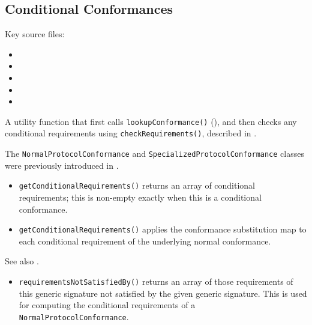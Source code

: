 \documentclass[../generics]{subfiles}
\begin{document}
\subsection*{Conditional Conformances}

Key source files:
\begin{itemize}
\item {}
\item {}
\item {}
\item {}
\item {}
\end{itemize}

A utility function that first calls \texttt{lookupConformance()} (), and then checks any conditional requirements using \texttt{checkRequirements()}, described in .

The \verb|NormalProtocolConformance| and \verb|SpecializedProtocolConformance| classes were previously introduced in .
\begin{itemize}
\item \texttt{getConditionalRequirements()} returns an array of conditional requirements; this is non-empty exactly when this is a conditional conformance.
\end{itemize}
\begin{itemize}
\item \texttt{getConditionalRequirements()} applies the conformance substitution map to each conditional requirement of the underlying normal conformance.
\end{itemize}
See also .
\begin{itemize}
\item \texttt{requirementsNotSatisfiedBy()} returns an array of those requirements of this generic signature not satisfied by the given generic signature. This is used for computing the conditional requirements of a \texttt{NormalProtocolConformance}.
\end{itemize}
\end{document}
